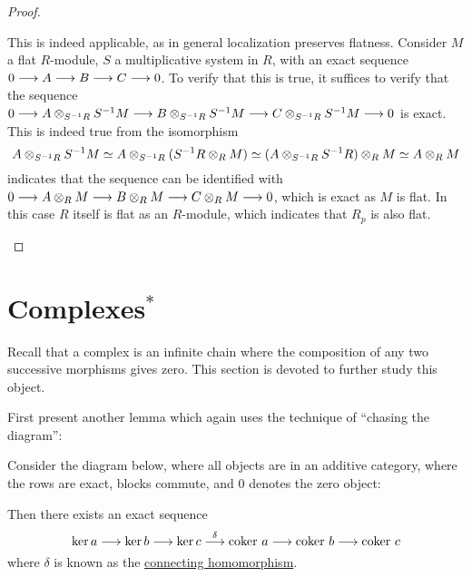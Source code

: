 \documentclass{article}
\begin{document}
\begin{proof}
\begin{enumerate}
        This is indeed applicable, as in general localization preserves flatness. Consider $M$ a flat $R$-module, $S$ a multiplicative system in $R$, with an exact sequence $0 \longrightarrow A \longrightarrow B \longrightarrow C \longrightarrow 0$. To verify that this is true, it suffices to verify that the sequence $0 \longrightarrow A \otimes_{S^{-1}R} S^{-1}M \longrightarrow B \otimes_{S^{-1}R} S^{-1}M \longrightarrow C \otimes_{S^{-1}R} S^{-1}M \longrightarrow 0$ is exact. This is indeed true from the isomorphism 
        \[
            A \otimes_{S^{-1}R} S^{-1}M \simeq A \otimes_{S^{-1}R} (S^{-1}R \otimes_R M) \simeq (A \otimes_{S^{-1}R} S^{-1}R) \otimes_R M \simeq A \otimes_R M
        \]
        indicates that the sequence can be identified with $0 \longrightarrow A \otimes_R M \longrightarrow B \otimes_R M \longrightarrow C \otimes_R M \longrightarrow 0$, which is exact as $M$ is flat. In this case $R$ itself is flat as an $R$-module, which indicates that $R_p$ is also flat.
    \end{enumerate}

\end{proof}

\section{Complexes$^*$}

Recall that a complex is an infinite chain where the composition of any two successive morphisms gives zero. This section is devoted to further study this object.

First present another lemma which again uses the technique of ``chasing the diagram'':

\begin{proposition}
    Consider the diagram below, where all objects are in an additive category, where the rows are exact, blocks commute, and $0$ denotes the zero object: 
    \begin{figure}[htbp]
        \centering
    \end{figure}

    Then there exists an exact sequence
    \[
        \ker a \longrightarrow \ker b \longrightarrow \ker c \overset{\delta}{\longrightarrow} \mathrm{coker}\  a \longrightarrow \mathrm{coker}\  b \longrightarrow \mathrm{coker}\  c
    \]
    where $\delta$ is known as the \underline{connecting homomorphism}.
\end{proposition}
\end{document}
